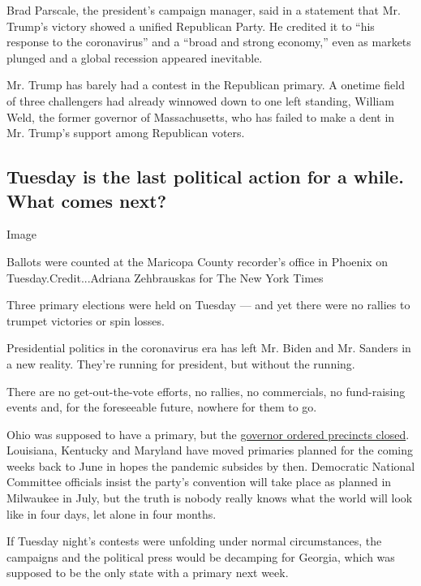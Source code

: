Brad Parscale, the president's campaign manager, said in a statement
that Mr. Trump's victory showed a unified Republican Party. He credited
it to ``his response to the coronavirus'' and a ``broad and strong
economy,'' even as markets plunged and a global recession appeared
inevitable.

Mr. Trump has barely had a contest in the Republican primary. A onetime
field of three challengers had already winnowed down to one left
standing, William Weld, the former governor of Massachusetts, who has
failed to make a dent in Mr. Trump's support among Republican voters.

\hypertarget{tuesday-is-the-last-political-action-for-a-while-what-comes-next}{%
\subsection{Tuesday is the last political action for a while. What comes
next?}\label{tuesday-is-the-last-political-action-for-a-while-what-comes-next}}

Image

Ballots were counted at the Maricopa County recorder's office in Phoenix
on Tuesday.Credit...Adriana Zehbrauskas for The New York Times

Three primary elections were held on Tuesday --- and yet there were no
rallies to trumpet victories or spin losses.

Presidential politics in the coronavirus era has left Mr. Biden and Mr.
Sanders in a new reality. They're running for president, but without the
running.

There are no get-out-the-vote efforts, no rallies, no commercials, no
fund-raising events and, for the foreseeable future, nowhere for them to
go.

Ohio was supposed to have a primary, but the
\href{https://www.nytimes3xbfgragh.onion/2020/03/17/us/politics/march-17-democratic-primary.html}{governor
ordered precincts closed}. Louisiana, Kentucky and Maryland have moved
primaries planned for the coming weeks back to June in hopes the
pandemic subsides by then. Democratic National Committee officials
insist the party's convention will take place as planned in Milwaukee in
July, but the truth is nobody really knows what the world will look like
in four days, let alone in four months.

If Tuesday night's contests were unfolding under normal circumstances,
the campaigns and the political press would be decamping for Georgia,
which was supposed to be the only state with a primary next week.

